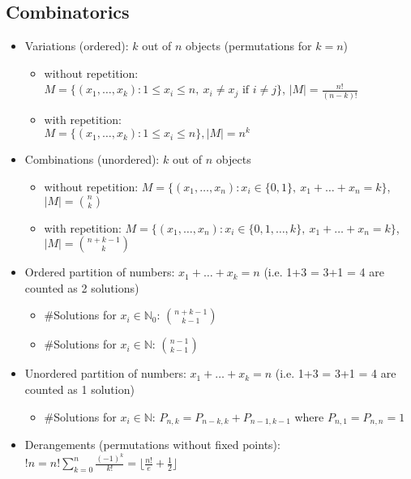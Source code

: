 \documentclass[10pt,a4paper,ngerman,oneside,]{article}
\begin{document}
\begin{multicols}{2}
\subsection{Combinatorics}
\begin{itemize}
\item Variations (ordered): $k$ out of $n$ objects {\footnotesize (permutations for $k = n$)}
\begin{itemize}
	\item without repetition:\\ $M = \{ (x_{1}, \ldots , x_{k}): 1 \leq x_i \leq n, \ x_i \neq x_j \mbox{ if } i \neq j \}$, $|M|= \frac{n!}{(n-k)!}$
	\item with repetition:\\ $M = \{ (x_{1}, \ldots , x_{k}): 1 \leq x_i \leq n \}, |M| = n^k$
	\end{itemize}
\item Combinations (unordered): $k$ out of $n$ objects
\begin{itemize}
	\item without repetition: $M = \{ (x_{1}, \ldots , x_{n}): x_i \in \{0,1\}, \ x_1 + \ldots + x_n = k \}$, $|M| = {n \choose k}$
	\item with repetition: $M = \{ (x_{1}, \ldots , x_{n}): x_i \in \{0,1,\ldots,k\}, \ x_1 + \ldots + x_n = k \}$, $|M| = {n+k-1 \choose k}$
\end{itemize}
\item Ordered partition of numbers: $x_1+\ldots+x_k = n$ {\footnotesize (i.e. 1+3 = 3+1 = 4 are counted as 2 solutions)}
\begin{itemize}
	\item \#Solutions for $x_i \in \mathbb{N}_0$: ${n+k-1 \choose k-1}$
	\item \#Solutions for $x_i \in \mathbb{N}$: ${n-1 \choose k-1}$
\end{itemize}
\item Unordered partition of numbers: $x_1+\ldots+x_k = n$ {\footnotesize (i.e. 1+3 = 3+1 = 4 are counted as 1 solution)}
\begin{itemize}
	\item \#Solutions for $x_i \in \mathbb{N}$: $P_{n,k} = P_{n-k,k}+P_{n-1,k-1}$ where $P_{n,1} = P_{n,n} = 1$
\end{itemize}
\item Derangements {\footnotesize (permutations without fixed points)}: $!n = n! \sum\nolimits_{k = 0}^n \frac{(-1)^k}{k!} = \lfloor \frac{n!}{e} + \frac{1}{2} \rfloor$
\end{itemize}

\end{multicols}
\end{document}
